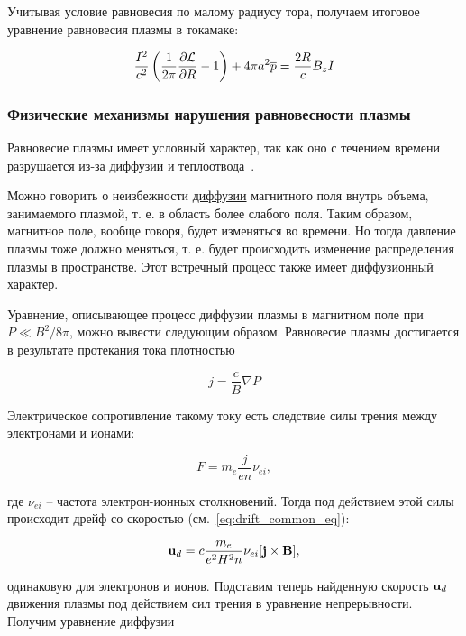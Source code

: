 \documentclass[10pt, a4paper]{article}
\begin{document}
Учитывая условие равновесия по малому радиусу тора, получаем итоговое уравнение равновесия плазмы в токамаке:

\begin{equation*}
   \frac{I^2}{c^2} \left( \frac{1}{2\pi}\pdv{\mathcal{L}}{R} - 1 \right) + 4\pi a^2 \overline{p} = \frac{2 R}{c} B_z I
\end{equation*}

\subsubsection{Физические механизмы нарушения равновесности плазмы}

Равновесие плазмы имеет условный
характер, так как оно с течением времени разрушается из-за диффузии и теплоотвода~\cite{arzimovich}.

Можно говорить о неизбежности \uline{диффузии} магнитного поля
внутрь объема, занимаемого плазмой, т. е. в область более слабого
поля. Таким образом, магнитное поле, вообще говоря, будет изменяться во времени. Но тогда давление плазмы тоже должно меняться, т. е. будет происходить изменение распределения
плазмы в пространстве. Этот встречный процесс также имеет диффузионный характер.

Уравнение, описывающее процесс диффузии плазмы в магнитном поле при $P\ll B^2/8\pi$, можно вывести следующим образом. Равновесие плазмы достигается в результате протекания тока плотностью

\begin{equation*}
	j = \frac{c}{B}\nabla P
\end{equation*}

Электрическое сопротивление
такому току есть следствие силы трения между электронами и ионами:

\begin{equation*}
	F = m_e\frac{j}{en}\nu_{ei},
\end{equation*}

где $\nu_{ei}$ -- частота электрон-ионных столкновений. Тогда под действием этой силы происходит дрейф со скоростью (см.~\eqref{eq:drift_common_eq}):

\begin{equation} \label{eq:magnetic_drift}
	\vb{u}_d = c \frac{m_e}{e^2H^2n}\nu_{ei}[\vb{j}\times\vb{B}],
\end{equation}

одинаковую для электронов и ионов. Подставим теперь найденную скорость $\vb{u}_d $ движения плазмы под действием сил трения в уравнение непрерывности. Получим уравнение
диффузии
\end{document}
